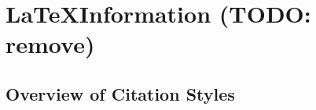 \chapter{\LaTeX Information (TODO: remove)}
\section{Overview of Citation Styles}
\textcite{breen_statecharts_2004}\\
\autocite{breen_statecharts_2004}\\
\autocite[10]{breen_statecharts_2004}\\
\autocite[10--20]{breen_statecharts_2004}\\